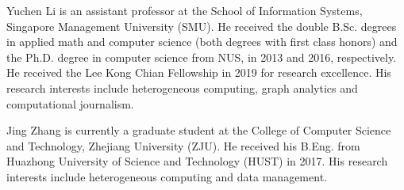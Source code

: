 \documentclass[10pt,journal,compsoc]{IEEEtran}
\begin{document}
\maketitle
\IEEEdisplaynontitleabstractindextext
\IEEEpeerreviewmaketitle











%





\begin{IEEEbiography}
	{Yuchen Li} is an assistant professor at the School of Information Systems, Singapore Management University (SMU).
	He received the double B.Sc. degrees in applied math and computer science (both degrees with first class honors)
	and the Ph.D. degree in computer science from NUS, in 2013 and 2016, respectively. He received the Lee Kong Chian Fellowship in 2019 for research excellence.
	His research interests include heterogeneous computing, graph analytics and computational journalism.
\end{IEEEbiography}
\vspace*{-2\baselineskip}

\begin{IEEEbiography}
	{Jing Zhang} is currently a graduate student at the College of Computer Science and Technology, Zhejiang University (ZJU). He received his B.Eng. from Huazhong University of Science and Technology (HUST) in 2017. His research interests include heterogeneous computing and data management.
\end{IEEEbiography}
\vspace*{-2\baselineskip}
\end{document}
